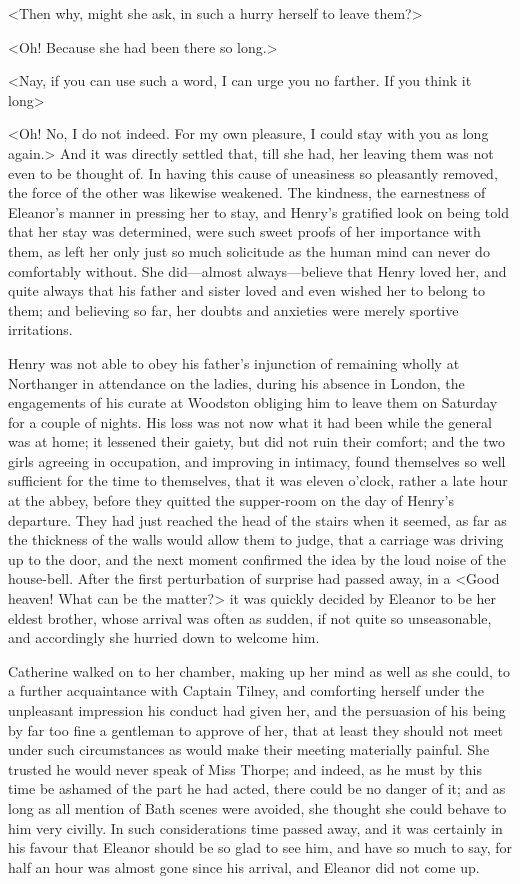  <Then why, might she ask, in such a hurry herself to leave them?> 

 <Oh! Because she had been there so long.> 

 <Nay, if you can use such a word, I can urge you no farther. If you think it long\longdash> 

 <Oh! No, I do not indeed. For my own pleasure, I could stay with you as long again.> And it was directly settled that, till she had, her leaving them was not even to be thought of. In having this cause of uneasiness so pleasantly removed, the force of the other was likewise weakened. The kindness, the earnestness of Eleanor's manner in pressing her to stay, and Henry's gratified look on being told that her stay was determined, were such sweet proofs of her importance with them, as left her only just so much solicitude as the human mind can never do comfortably without. She did—almost always—believe that Henry loved her, and quite always that his father and sister loved and even wished her to belong to them; and believing so far, her doubts and anxieties were merely sportive irritations. 

 Henry was not able to obey his father's injunction of remaining wholly at Northanger in attendance on the ladies, during his absence in London, the engagements of his curate at Woodston obliging him to leave them on Saturday for a couple of nights. His loss was not now what it had been while the general was at home; it lessened their gaiety, but did not ruin their comfort; and the two girls agreeing in occupation, and improving in intimacy, found themselves so well sufficient for the time to themselves, that it was eleven o'clock, rather a late hour at the abbey, before they quitted the supper-room on the day of Henry's departure. They had just reached the head of the stairs when it seemed, as far as the thickness of the walls would allow them to judge, that a carriage was driving up to the door, and the next moment confirmed the idea by the loud noise of the house-bell. After the first perturbation of surprise had passed away, in a <Good heaven! What can be the matter?> it was quickly decided by Eleanor to be her eldest brother, whose arrival was often as sudden, if not quite so unseasonable, and accordingly she hurried down to welcome him. 

 Catherine walked on to her chamber, making up her mind as well as she could, to a further acquaintance with Captain Tilney, and comforting herself under the unpleasant impression his conduct had given her, and the persuasion of his being by far too fine a gentleman to approve of her, that at least they should not meet under such circumstances as would make their meeting materially painful. She trusted he would never speak of Miss Thorpe; and indeed, as he must by this time be ashamed of the part he had acted, there could be no danger of it; and as long as all mention of Bath scenes were avoided, she thought she could behave to him very civilly. In such considerations time passed away, and it was certainly in his favour that Eleanor should be so glad to see him, and have so much to say, for half an hour was almost gone since his arrival, and Eleanor did not come up. 

